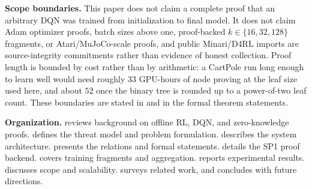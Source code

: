 \noindent\textbf{Scope boundaries.} This paper does not claim a complete proof
that an arbitrary DQN was trained from initialization to final model. It does
not claim Adam optimizer proofs, batch sizes above one, proof-backed
$k \in \{16,32,128\}$ fragments, or Atari/MuJoCo-scale proofs, and public
Minari/D4RL imports are source-integrity commitments rather than evidence of
honest collection. Proof length is bounded by cost rather than by arithmetic: a
CartPole run long enough to learn well would need roughly $33$ GPU-hours of
node proving at the leaf size used here, and about $52$ once the binary tree is
rounded up to a power-of-two leaf count. These boundaries are stated in
 and in the formal theorem statements.

\smallskip
\noindent\textbf{Organization.}  reviews background on
offline RL, DQN, and zero-knowledge proofs.  defines the
threat model and problem formulation.  describes the
system architecture.  presents the relations and formal
statements.  details the SP1 proof backend.
 covers training fragments and aggregation.
 reports experimental results.
 discusses scope and scalability.
 surveys related work, and
 concludes with future directions.
